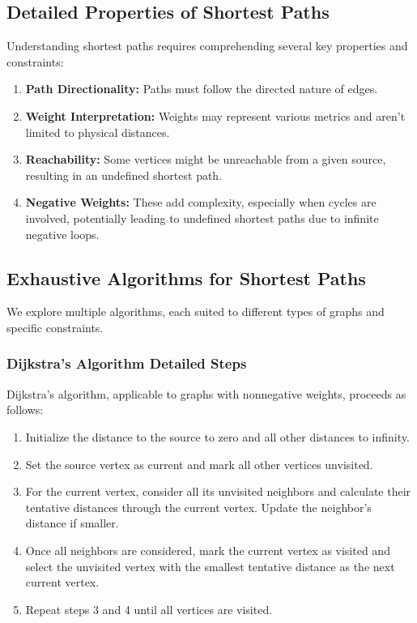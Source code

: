 \documentclass{article}
\begin{document}
\subsection{Detailed Properties of Shortest Paths}
Understanding shortest paths requires comprehending several key properties and constraints:
\begin{enumerate}
    \item \textbf{Path Directionality:} Paths must follow the directed nature of edges.
    \item \textbf{Weight Interpretation:} Weights may represent various metrics and aren't limited to physical distances.
    \item \textbf{Reachability:} Some vertices might be unreachable from a given source, resulting in an undefined shortest path.
    \item \textbf{Negative Weights:} These add complexity, especially when cycles are involved, potentially leading to undefined shortest paths due to infinite negative loops.
\end{enumerate}

\subsection{Exhaustive Algorithms for Shortest Paths}
We explore multiple algorithms, each suited to different types of graphs and specific constraints.

\subsubsection{Dijkstra's Algorithm Detailed Steps}
Dijkstra's algorithm, applicable to graphs with nonnegative weights, proceeds as follows:
\begin{enumerate}
    \item Initialize the distance to the source to zero and all other distances to infinity.
    \item Set the source vertex as current and mark all other vertices unvisited.
    \item For the current vertex, consider all its unvisited neighbors and calculate their tentative distances through the current vertex. Update the neighbor's distance if smaller.
    \item Once all neighbors are considered, mark the current vertex as visited and select the unvisited vertex with the smallest tentative distance as the next current vertex.
    \item Repeat steps 3 and 4 until all vertices are visited.
\end{enumerate}
\end{document}
